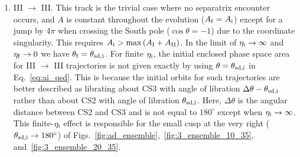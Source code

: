 \documentclass[twocolumn,twocolappendix]{aastex63}
\newcommand*{\p}[1]{\left(#1\right)}
\begin{document}
\begin{enumerate}
    \item III $\to$ III\@. This track is the trivial case where no separatrix
        encounter occurs, and $A$ is constant throughout the evolution ($A_{\rm
        f} = A_{\rm i}$) except for a jump by $4\pi$ when crossing the South
        pole ($\cos \theta = -1$) due to the coordinate singularity. This
        requires $A_{\rm i} > \max \p{A_{\rm I} + A_{\rm II}}$. In the limit of
        $\eta_{\rm i} \to \infty$ and $ \eta_{\rm f} \to 0$ we have $\theta_{\rm
        f} = \theta_{\rm sd, i}$. For finite $\eta_{\rm i}$, the initial
        enclosed phase space area for III $\to$ III trajectories is not given
        exactly by using $\theta = \theta_{\rm sd, i}$ in Eq.~\eqref{eq:ai_qsd}.
        This is because the initial orbits for such trajectories are better
        described as librating about CS3 with angle of libration $\Delta \theta
        - \theta_{\rm sd, i}$ rather than about CS2 with angle of libration
        $\theta_{\rm sd, i}$. Here, $\Delta \theta$ is the angular distance
        between CS2 and CS3 and is not equal to $180^\circ$ except when
        $\eta_{\rm i} \to \infty$. This finite-$\eta_{\rm i}$ effect is
        responsible for the small cusp at the very right ($\theta_{\rm sd, i}
        \to 180^\circ$) of
        Figs.~\ref{fig:ad_ensemble},~\ref{fig:3_ensemble_10_35},
        and~\ref{fig:3_ensemble_20_35}.
\end{enumerate}
\end{document}
